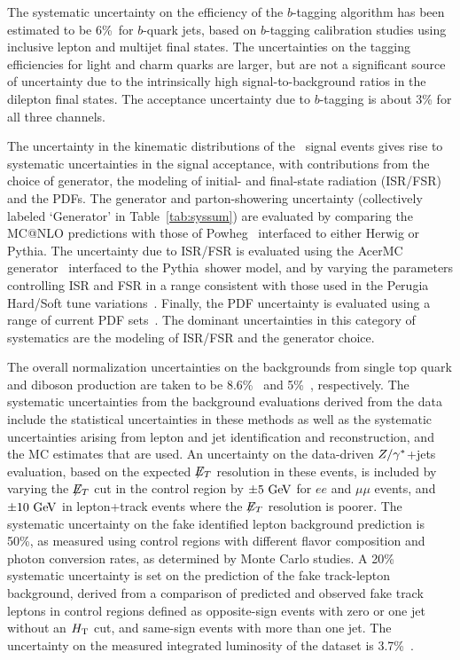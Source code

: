 The systematic uncertainty on the efficiency of the $b$-tagging algorithm has been estimated to be $6$\%\ for $b$-quark jets, based on $b$-tagging calibration studies using inclusive lepton and multijet final states.
The uncertainties on the tagging efficiencies for light and charm quarks are larger, but are not a significant source of uncertainty due to the
intrinsically high signal-to-background ratios in the dilepton final states.
The acceptance uncertainty due to $b$-tagging is about 3\% for all three channels.

The uncertainty in the kinematic distributions of the \ttbar\ signal events
gives rise to systematic uncertainties in
the signal acceptance, with contributions from the choice of generator, the modeling of initial- and final-state
radiation (ISR/FSR) and the PDFs.
The generator and parton-showering uncertainty (collectively labeled
`Generator' in Table~\ref{tab:syssum}) are evaluated by comparing the
{\sc MC@NLO} predictions  with those of
{\sc Powheg}~\cite{powheg,Frixione:2007vw,Alioli:2010xd} interfaced to
either {\sc Herwig} or {\sc Pythia}.
The uncertainty due to ISR/FSR is evaluated using the {\sc AcerMC} generator~\cite{Acer}
interfaced to the {\sc Pythia}\ shower model, and by varying the parameters controlling ISR
and FSR in a range consistent with those used in the Perugia Hard/Soft tune variations~\cite{Skands}.
Finally, the PDF uncertainty is evaluated using a range of
current PDF sets~\cite{cteq6l}.
The dominant uncertainties in this category of systematics are the
modeling of ISR/FSR and the generator choice.

The overall normalization uncertainties on the backgrounds from
single top quark and diboson production are taken to be
8.6\%~\cite{PhysRevD.83.091503} and 5\%~\cite{Campbell:2010ff},
respectively.
%
The systematic uncertainties from the background evaluations derived from the data include the statistical uncertainties in these methods as well as the systematic uncertainties arising from lepton and jet identification and reconstruction, and the MC estimates that are used.
An uncertainty on the data-driven $Z/\gamma^{*}$+jets evaluation, based on the
expected $\not\!\!{E_{T}}$ resolution in these events, is included by varying the
$\not\!\!{E_{T}}$ cut in the control region by $\pm 5\GeV$ for $ee$ and $\mu\mu$
events, and $\pm 10\GeV$ in lepton+track events where the $\not\!\!{E_{T}}$
resolution is poorer.
The systematic uncertainty on the fake identified lepton background prediction is 50\%, as measured using control regions with different flavor composition and photon conversion rates, as determined by Monte Carlo studies. A 20\% systematic uncertainty is set on the prediction of the fake track-lepton background, derived from a comparison of predicted and observed fake track leptons in control
regions defined as opposite-sign events with zero or one jet without an $H_{\mathrm{T}}$ cut, and same-sign events with more than one jet.
%
The uncertainty on the measured integrated luminosity of the dataset
is 3.7\%~\cite{lumi}.

